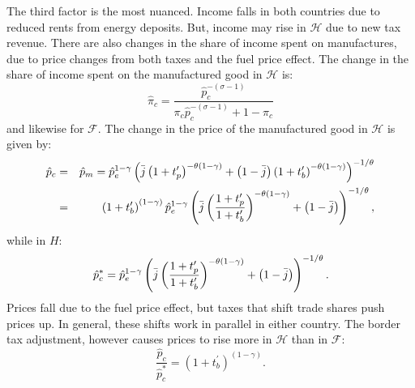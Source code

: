 \documentclass[notitlepage,12pt]{article}
\begin{document}
The third factor is the most nuanced. Income falls in both countries due to
reduced rents from energy deposits. But, income may rise in $\mathcal{H}$
due to new tax revenue. There are also changes in the share of income spent
on manufactures, due to price changes from both taxes and the fuel price
effect. The change in the share of income spent on the manufactured good in $%
\mathcal{H}$ is:%
\begin{equation*}
\hat{\pi}_{c}=\frac{\hat{p}_{c}^{-\left( \sigma -1\right) }}{\pi _{c}\hat{p}%
_{c}^{-\left( \sigma -1\right) }+1-\pi _{c}}
\end{equation*}%
and likewise for $\mathcal{F}$. The change in the price of the manufactured
good in $\mathcal{H}$ is given by:%
\begin{eqnarray*}
\hat{p}_{c} &=&\hat{p}_{m}=\hat{p}_{e}^{1-\gamma }\left( \bar{j}\left(
1+t_{p}^{\prime }\right) ^{-\theta \left( 1-\gamma \right) }+\left( 1-\bar{j}%
\right) \left( 1+t_{b}^{\prime }\right) ^{-\theta \left( 1-\gamma \right)
}\right) ^{-1/\theta } \\
&=&\left( 1+t_{b}^{\prime }\right) ^{\left( 1-\gamma \right) }\hat{p}%
_{e}^{1-\gamma }\left( \bar{j}\left( \frac{1+t_{p}^{\prime }}{%
1+t_{b}^{\prime }}\right) ^{-\theta \left( 1-\gamma \right) }+\left( 1-\bar{j%
}\right) \right) ^{-1/\theta },
\end{eqnarray*}%
while in $H$:%
\begin{equation*}
\hat{p}_{c}^{\ast }=\hat{p}_{e}^{1-\gamma }\left( \bar{j}\left( \frac{%
1+t_{p}^{\prime }}{1+t_{b}^{\prime }}\right) ^{-\theta \left( 1-\gamma
\right) }+\left( 1-\bar{j}\right) \right) ^{-1/\theta }.
\end{equation*}%
Prices fall due to the fuel price effect, but taxes that shift trade shares
push prices up. In general, these shifts work in parallel in either country.
The border tax adjustment, however causes prices to rise more in $\mathcal{H}
$ than in $\mathcal{F}$:%
\begin{equation*}
\frac{\hat{p}_{c}}{\hat{p}_{c}^{\ast }}=\left( 1+t_{b}^{\prime }\right)
^{\left( 1-\gamma \right) }.
\end{equation*}
\end{document}
